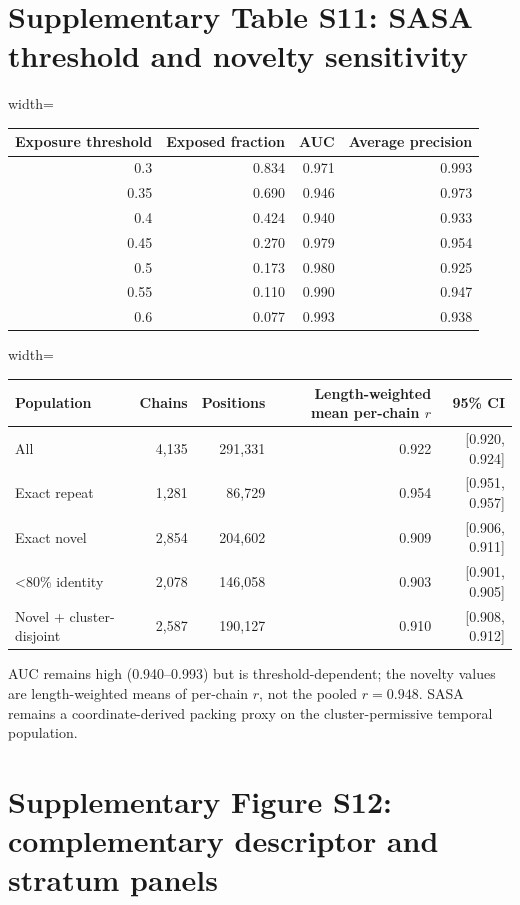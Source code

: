 \documentclass[pdflatex,sn-nature]{sn-jnl}
\begin{document}
\section*{Supplementary Table S11: SASA threshold and novelty sensitivity}

\begingroup\scriptsize
\begin{adjustbox}{width=\textwidth}
\begin{tabular}{rrrr}
\toprule
Exposure threshold & Exposed fraction & AUC & Average precision \\
\midrule
0.3 & 0.834 & 0.971 & 0.993 \\
0.35 & 0.690 & 0.946 & 0.973 \\
0.4 & 0.424 & 0.940 & 0.933 \\
0.45 & 0.270 & 0.979 & 0.954 \\
0.5 & 0.173 & 0.980 & 0.925 \\
0.55 & 0.110 & 0.990 & 0.947 \\
0.6 & 0.077 & 0.993 & 0.938 \\
\bottomrule
\end{tabular}
\end{adjustbox}
\endgroup

\begingroup\scriptsize
\begin{adjustbox}{width=\textwidth}
\begin{tabular}{lrrrr}
\toprule
Population & Chains & Positions & Length-weighted mean per-chain $r$ & 95\% CI \\
\midrule
All & 4,135 & 291,331 & 0.922 & [0.920, 0.924] \\
Exact repeat & 1,281 & 86,729 & 0.954 & [0.951, 0.957] \\
Exact novel & 2,854 & 204,602 & 0.909 & [0.906, 0.911] \\
<80\% identity & 2,078 & 146,058 & 0.903 & [0.901, 0.905] \\
Novel + cluster-disjoint & 2,587 & 190,127 & 0.910 & [0.908, 0.912] \\
\bottomrule
\end{tabular}
\end{adjustbox}
\endgroup

AUC remains high (0.940--0.993) but is threshold-dependent; the novelty values are
length-weighted means of per-chain $r$, not the pooled $r=0.948$. SASA remains a
coordinate-derived packing proxy on the cluster-permissive temporal population.

\section*{Supplementary Figure S12: complementary descriptor and stratum panels}
\end{document}
